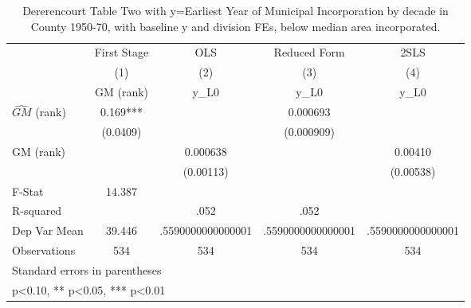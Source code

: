 \begin{table}[htbp]\centering
\def\sym#1{\ifmmode^{#1}\else\(^{#1}\)\fi}
\caption{Dererencourt Table Two with y=Earliest Year of Municipal Incorporation by decade in County 1950-70, with baseline y and division FEs, below median area incorporated.}
\begin{tabular}{l*{4}{c}}
\toprule
                    & First Stage   &         OLS   &Reduced Form   &        2SLS   \\
                    &\multicolumn{1}{c}{(1)}&\multicolumn{1}{c}{(2)}&\multicolumn{1}{c}{(3)}&\multicolumn{1}{c}{(4)}\\
                    &\multicolumn{1}{c}{GM  (rank)}&\multicolumn{1}{c}{y\_L0}&\multicolumn{1}{c}{y\_L0}&\multicolumn{1}{c}{y\_L0}\\
\midrule
$\hat{GM}$ (rank)   &       0.169***&               &    0.000693   &               \\
                    &    (0.0409)   &               &  (0.000909)   &               \\
\addlinespace
GM  (rank)          &               &    0.000638   &               &     0.00410   \\
                    &               &   (0.00113)   &               &   (0.00538)   \\
\midrule
F-Stat              &      14.387   &               &               &               \\
R-squared           &               &        .052   &        .052   &               \\
Dep Var Mean        &      39.446   &.5590000000000001   &.5590000000000001   &.5590000000000001   \\
Observations        &         534   &         534   &         534   &         534   \\
\bottomrule
\multicolumn{5}{l}{\footnotesize Standard errors in parentheses}\\
\multicolumn{5}{l}{\footnotesize * p<0.10, ** p<0.05, *** p<0.01}\\
\end{tabular}
\end{table}
